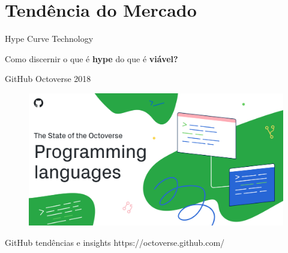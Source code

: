 \section{Tendência do Mercado}

\begin{frame}[fragile]{Hype Curve Technology}
\begin{figure}[ht!]
  \centering
  
\end{figure}
\begin{center}
\small{Como discernir o que é \textbf{hype} do que é \textbf{viável?}}
\end{center}
\end{frame}

\begin{frame}[fragile]{GitHub Octoverse 2018}
\begin{figure}[ht!]
  \centering
  \includegraphics[scale=0.3]{images/octoverse.png}
\end{figure}
\begin{center}
\small{GitHub tendências e insights}
\small{https://octoverse.github.com/}
\end{center}
\end{frame}


